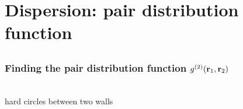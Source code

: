 
\section{Dispersion: pair distribution function}

\subsection{}

\begin{frame}
  \frametitle{Finding the pair distribution function $g^{(2)}(\mathbf{r}_1,\mathbf{r}_2)$}
  \vspace{-0.8em}
  \begin{center}
    \\
    \vspace{-1.5em}
    hard circles between two walls
  \end{center}
\end{frame}


